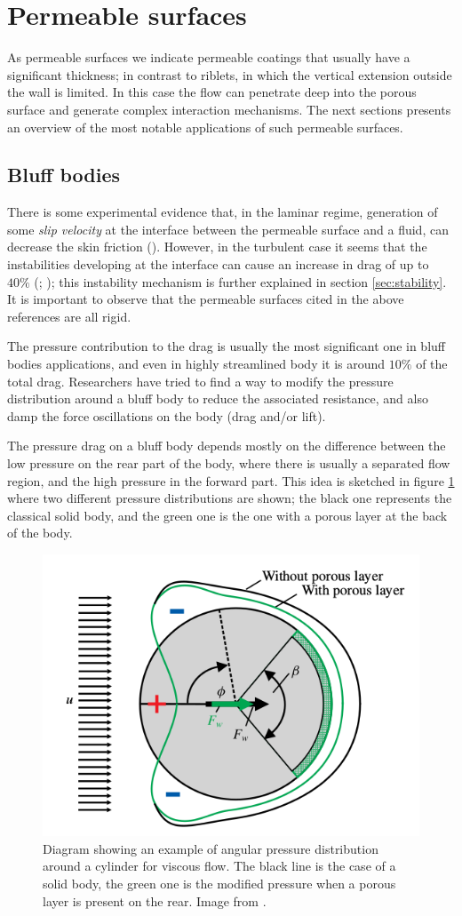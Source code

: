 \section{Permeable surfaces}
As permeable surfaces we indicate permeable coatings that usually have a significant thickness; in contrast to riblets, in which the vertical extension outside the wall is limited.
In this case the flow can penetrate deep into the porous surface and generate complex interaction mechanisms.
The next sections presents an overview of the most notable applications of such permeable surfaces.

\subsection{Bluff bodies}

There is some experimental evidence that, in the laminar regime, generation of some \textit{slip velocity} at the interface between the permeable surface and a fluid, can decrease the skin friction (\citet{beavers1967boundary}).
However, in the turbulent case it seems that the instabilities developing at the interface can cause an increase in drag of up to $40\%$ (\citet{jimenez2001turbulent}; \citet{breugem2006influence}); this instability mechanism is further explained in section \ref{sec:stability}.
It is important to observe that the permeable surfaces cited in the above references are all rigid.

The pressure contribution to the drag is usually the most significant one in bluff bodies applications, and even in highly streamlined body it is around $10\%$ of the total drag.
Researchers have tried to find a way to modify the pressure distribution around a bluff body to reduce the associated resistance, and also damp the force oscillations on the body (drag and/or lift).

The pressure drag on a bluff body depends mostly on the difference between the low pressure on the rear part of the body, where there is usually a separated flow region, and the high pressure in the forward part.
This idea is sketched in figure \ref{fig:pressure_dist} where two different pressure distributions are shown; the black one represents the classical solid body, and the green one is the one with a porous layer at the back of the body.

\begin{figure}[h]
	\centering
	\includegraphics[width=0.4\linewidth]{chapter_1/pressure_dist}
	\caption{Diagram showing an example of angular pressure distribution around a cylinder for viscous flow. The black line is the case of a solid body, the green one is the modified pressure when a porous layer is present on the rear. Image from \citet{klausmann2017drag}.}
	\label{fig:pressure_dist}
\end{figure}

